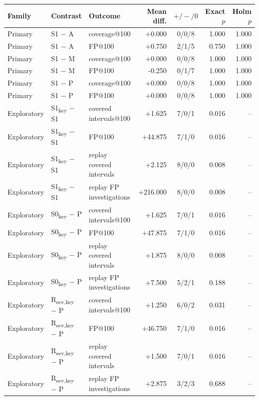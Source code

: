 \begin{tabular}{lllrcrr}
\toprule
Family & Contrast & Outcome & Mean diff. & $+/-/0$ & Exact $p$ & Holm $p$ \\
\midrule
Primary & S1 $-$ A & coverage@100 & +0.000 & 0/0/8 & 1.000 & 1.000 \\
Primary & S1 $-$ A & FP@100 & +0.750 & 2/1/5 & 0.750 & 1.000 \\
Primary & S1 $-$ M & coverage@100 & +0.000 & 0/0/8 & 1.000 & 1.000 \\
Primary & S1 $-$ M & FP@100 & -0.250 & 0/1/7 & 1.000 & 1.000 \\
Primary & S1 $-$ P & coverage@100 & +0.000 & 0/0/8 & 1.000 & 1.000 \\
Primary & S1 $-$ P & FP@100 & +0.000 & 0/0/8 & 1.000 & 1.000 \\
\midrule
Exploratory & S1\textsubscript{key} $-$ S1 & covered intervals@100 & +1.625 & 7/0/1 & 0.016 & -- \\
Exploratory & S1\textsubscript{key} $-$ S1 & FP@100 & +44.875 & 7/1/0 & 0.016 & -- \\
Exploratory & S1\textsubscript{key} $-$ S1 & replay covered intervals & +2.125 & 8/0/0 & 0.008 & -- \\
Exploratory & S1\textsubscript{key} $-$ S1 & replay FP investigations & +216.000 & 8/0/0 & 0.008 & -- \\
Exploratory & S0\textsubscript{key} $-$ P & covered intervals@100 & +1.625 & 7/0/1 & 0.016 & -- \\
Exploratory & S0\textsubscript{key} $-$ P & FP@100 & +47.875 & 7/1/0 & 0.016 & -- \\
Exploratory & S0\textsubscript{key} $-$ P & replay covered intervals & +1.875 & 8/0/0 & 0.008 & -- \\
Exploratory & S0\textsubscript{key} $-$ P & replay FP investigations & +7.500 & 5/2/1 & 0.188 & -- \\
Exploratory & R\textsubscript{sev,key} $-$ P & covered intervals@100 & +1.250 & 6/0/2 & 0.031 & -- \\
Exploratory & R\textsubscript{sev,key} $-$ P & FP@100 & +46.750 & 7/1/0 & 0.016 & -- \\
Exploratory & R\textsubscript{sev,key} $-$ P & replay covered intervals & +1.500 & 7/0/1 & 0.016 & -- \\
Exploratory & R\textsubscript{sev,key} $-$ P & replay FP investigations & +2.875 & 3/2/3 & 0.688 & -- \\
\bottomrule
\end{tabular}
